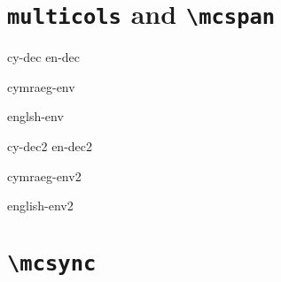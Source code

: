 \documentclass{article}
\begin{document}
\section{{\tt multicols} and  {\tt\textbackslash mcspan}}


\begin{multicols}

\cy cy-dec \en en-dec \zz

  

\begin{cymraeg}
cymraeg-env
\end{cymraeg}

\begin{english}
englsh-env
\end{english}

\mcspan{\bigskip\lipsum[5]\bigskip} %

\cy cy-dec2 \en en-dec2 \zz

  

\begin{cymraeg}
cymraeg-env2
\end{cymraeg}

\begin{english}
english-env2
\end{english}

\end{multicols}


\section{{\tt\textbackslash mcsync}}
\end{document}
